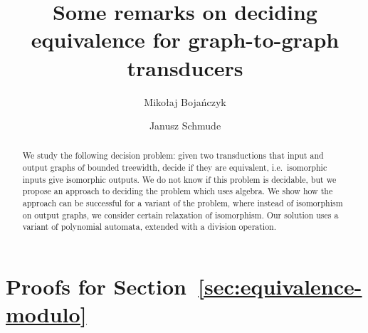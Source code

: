 \documentclass[a4paper,english]{lipics-v2019}
\title{Some remarks on deciding equivalence for graph-to-graph transducers}
\author{Miko\l aj Boja\' nczyk}{Institute of Informatics,\\ University of
Warsaw, Poland}{bojan@mimuw.edu.pl}{}{}
\author{Janusz Schmude}{Institute of Informatics,\\ University of
Warsaw, Poland}{jschmude@mimuw.edu.pl}{}{}
\begin{document}




\maketitle

\begin{abstract}
    We  study the following decision problem: given two \mso transductions that input and output graphs of bounded treewidth, decide if they are equivalent, i.e.~isomorphic inputs give isomorphic outputs. We do not know  if this problem is decidable, but  we  propose an approach to deciding the problem which uses algebra. We  show how the approach can be successful for a variant of the problem, where instead of isomorphism on output graphs, we consider certain relaxation of isomorphism. Our solution uses a variant of polynomial automata, extended with a division operation.
\end{abstract}


% 


% 

%



\appendix

\section{Proofs for Section~\ref{sec:equivalence-modulo}}


%
\end{document}

